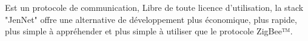 \item [JenNet]
Est un protocole de communication, Libre de toute licence d'utilisation, la stack "JenNet" offre une alternative de développement plus économique, plus rapide, plus simple à appréhender et plus simple à utiliser que le protocole ZigBee™.